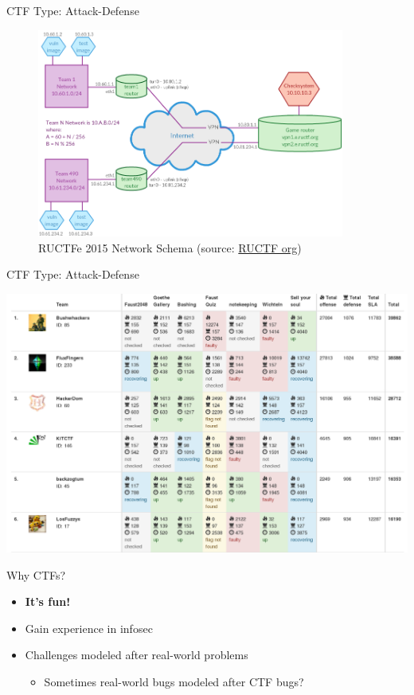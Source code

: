 \begin{frame}
  {CTF Type: Attack-Defense}

  \begin{figure}[h]
    \centering
    \includegraphics[width=0.9\textwidth]{./images/ructf-network.png}
    \caption{RUCTFe 2015 Network Schema (source:
      \href{https://ructf.org/e/2015/network.html}{RUCTF org}) }
  \end{figure}
\end{frame}
\begin{frame}
  {CTF Type: Attack-Defense}

  \begin{center}
    \includegraphics[width=\textwidth]{./images/faustctf-scoreboard.png}
  \end{center}

\end{frame}


\begin{frame}
  {Why CTFs?}

  \begin{itemize}
    \item \textbf{It's fun!}
    \item Gain experience in infosec
    \item Challenges modeled after real-world problems
      \begin{itemize}
        \item Sometimes real-world bugs modeled after CTF bugs?
      \end{itemize}
  \end{itemize}
\end{frame}



